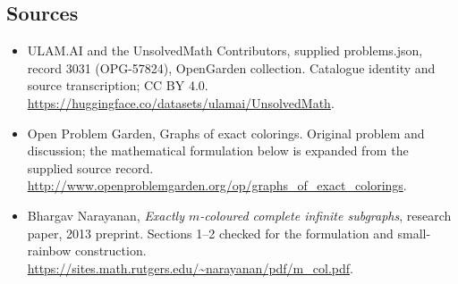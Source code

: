 \documentclass[11pt,a4paper]{article}
\begin{document}
\subsection{Sources}
\begin{itemize}
\item[S1] ULAM.AI and the UnsolvedMath Contributors, supplied problems.json, record 3031 (OPG-57824), OpenGarden collection. Catalogue identity and source transcription; CC BY 4.0.
\url{https://huggingface.co/datasets/ulamai/UnsolvedMath}.
\item[S2] Open Problem Garden, Graphs of exact colorings. Original problem and discussion; the mathematical formulation below is expanded from the supplied source record.
\url{http://www.openproblemgarden.org/op/graphs_of_exact_colorings}.

\item[R1] Bhargav Narayanan, \emph{Exactly $m$-coloured complete infinite
subgraphs}, research paper, 2013 preprint. Sections 1--2 checked for the
formulation and small-rainbow construction.
\url{https://sites.math.rutgers.edu/~narayanan/pdf/m_col.pdf}.

\end{itemize}
\end{document}
